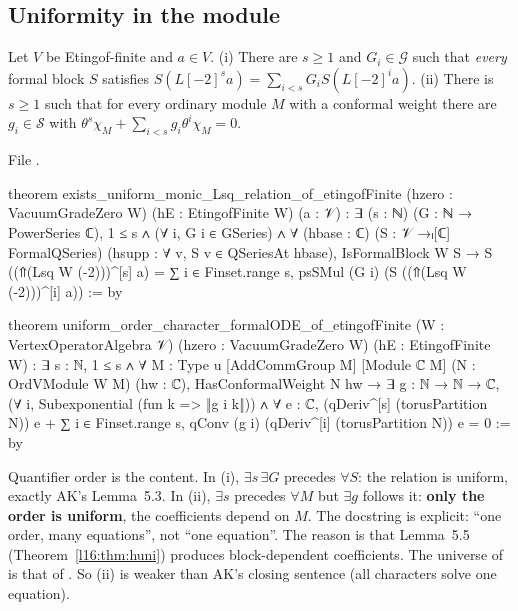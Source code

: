 \subsection{Uniformity in the module}

\begin{theorem}\label{l16:thm:uniform}
Let $V$ be Etingof-finite and $a\in V$. (i) There are $s\ge1$ and $G_i\in\mathcal G$ such that \emph{every} formal block
$S$ satisfies $S(L[-2]^sa) = \sum_{i<s}G_iS(L[-2]^ia)$. (ii) There is $s\ge1$ such that for every ordinary module $M$ with a
conformal weight there are $g_i\in\mathcal S$ with $\theta^s\chi_M + \sum_{i<s}g_i\theta^i\chi_M = 0$.
\end{theorem}
\noindent File .
\begin{leancode}
theorem exists_uniform_monic_Lsq_relation_of_etingofFinite
    (hzero : VacuumGradeZero W) (hE : EtingofFinite W) (a : 𝒱) :
    ∃ (s : ℕ) (G : ℕ → PowerSeries ℂ), 1 ≤ s ∧ (∀ i, G i ∈ GSeries) ∧
      ∀ (hbase : ℂ) (S : 𝒱 →ₗ[ℂ] FormalQSeries) (hsupp : ∀ v, S v ∈ QSeriesAt hbase),
        IsFormalBlock W S →
          S ((⇑(Lsq W (-2)))^[s] a)
            = ∑ i ∈ Finset.range s, psSMul (G i) (S ((⇑(Lsq W (-2)))^[i] a)) := by

theorem uniform_order_character_formalODE_of_etingofFinite (W : VertexOperatorAlgebra 𝒱)
    (hzero : VacuumGradeZero W) (hE : EtingofFinite W) :
    ∃ s : ℕ, 1 ≤ s ∧
      ∀ {M : Type u} [AddCommGroup M] [Module ℂ M] (N : OrdVModule W M) (hw : ℂ),
        HasConformalWeight N hw →
          ∃ g : ℕ → ℕ → ℂ, (∀ i, Subexponential (fun k => ‖g i k‖)) ∧
            ∀ e : ℂ, (qDeriv^[s] (torusPartition N)) e
              + ∑ i ∈ Finset.range s,
                  qConv (g i) (qDeriv^[i] (torusPartition N)) e = 0 := by
\end{leancode}

\begin{dictionary}
Quantifier order is the content. In (i), $\exists s\,\exists G$ precedes $\forall S$: the relation is uniform, exactly
AK's Lemma~5.3. In (ii), $\exists s$ precedes $\forall M$ but $\exists g$ follows it: \textbf{only the order is uniform}, the
coefficients depend on $M$. The docstring is explicit: ``one order, many equations'', not ``one equation''. The reason
is that Lemma~5.5 (Theorem~\ref{l16:thm:huni}) produces block-dependent coefficients. The universe of  is that of
. So (ii) is weaker than AK's closing sentence (all characters solve one equation).
\end{dictionary}

